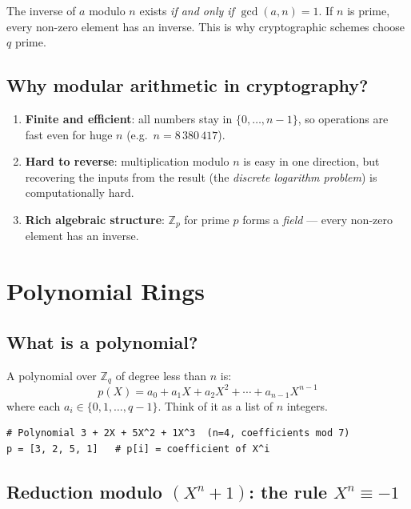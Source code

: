 \documentclass[11pt,a4paper]{article}
\begin{document}
\begin{warningbox}
The inverse of $a$ modulo $n$ exists \emph{if and only if} $\gcd(a, n) = 1$. If $n$ is prime, every non-zero element has an inverse. This is why cryptographic schemes choose $q$ prime.
\end{warningbox}

\subsection{Why modular arithmetic in cryptography?}

\begin{enumerate}
  \item \textbf{Finite and efficient}: all numbers stay in $\{0, \ldots, n-1\}$, so operations are fast even for huge $n$ (e.g.\ $n = 8\,380\,417$).
  \item \textbf{Hard to reverse}: multiplication modulo $n$ is easy in one direction, but recovering the inputs from the result (the \emph{discrete logarithm problem}) is computationally hard.
  \item \textbf{Rich algebraic structure}: $\mathbb{Z}_p$ for prime $p$ forms a \emph{field} --- every non-zero element has an inverse.
\end{enumerate}

\section{Polynomial Rings}

\subsection{What is a polynomial?}

A polynomial over $\mathbb{Z}_q$ of degree less than $n$ is:
\[p(X) = a_0 + a_1 X + a_2 X^2 + \cdots + a_{n-1} X^{n-1}\]
where each $a_i \in \{0, 1, \ldots, q-1\}$. Think of it as a list of $n$ integers.

\begin{lstlisting}[style=python]
# Polynomial 3 + 2X + 5X^2 + 1X^3  (n=4, coefficients mod 7)
p = [3, 2, 5, 1]   # p[i] = coefficient of X^i
\end{lstlisting}

\subsection{Reduction modulo $(X^n + 1)$: the rule $X^n \equiv -1$}
\end{document}
